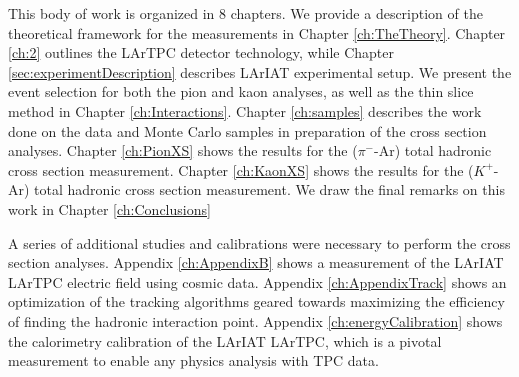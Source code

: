 This body of work is organized in 8 chapters.
We provide a description of the theoretical framework for the measurements in  Chapter \ref{ch:TheTheory}. Chapter \ref{ch:2} outlines the LArTPC detector technology, while
Chapter \ref{sec:experimentDescription} describes LArIAT experimental setup. We present the event selection for both the pion and kaon analyses, as well as the thin slice method in Chapter \ref{ch:Interactions}.  Chapter \ref{ch:samples}  describes the work done on the data and Monte Carlo samples in preparation of the cross section analyses.
Chapter \ref{ch:PionXS} shows  the results for the ($\pi^-$-Ar) total hadronic cross section measurement. Chapter \ref{ch:KaonXS} shows  the results for the ($K^+$-Ar) total hadronic cross section measurement. We draw the final remarks on this work in Chapter \ref{ch:Conclusions}

A series of additional studies and calibrations were necessary to perform the cross section analyses. Appendix \ref{ch:AppendixB} shows a measurement of the LArIAT LArTPC electric field using cosmic data. Appendix \ref{ch:AppendixTrack} shows an optimization of the tracking algorithms geared towards maximizing the efficiency of finding the hadronic interaction point. Appendix \ref{ch:energyCalibration} shows the calorimetry calibration of the LArIAT LArTPC, which is a pivotal measurement to enable any physics analysis with TPC data.  


